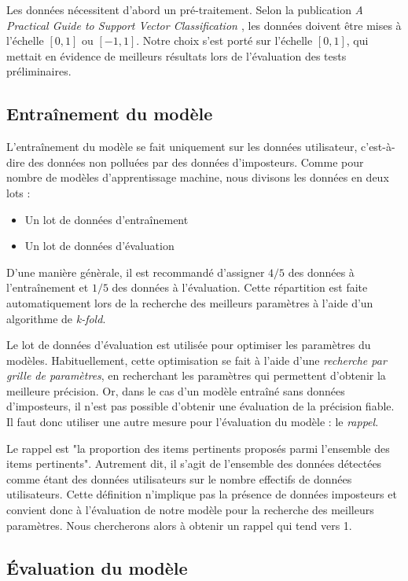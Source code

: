 Les données nécessitent d'abord un pré-traitement. Selon la publication \textit{A Practical Guide to Support Vector Classification \cite{svmpractical}}, les données doivent être mises à l'échelle $[0, 1]$ ou $[-1, 1]$. Notre choix s'est porté sur l'échelle $[0, 1]$, qui mettait en évidence de meilleurs résultats lors de l'évaluation des tests préliminaires.

\label{modele}
\subsection{Entraînement du modèle}

L'entraînement du modèle se fait uniquement sur les données utilisateur, c'est-à-dire des données non polluées par des données d'imposteurs. Comme pour nombre de modèles d'apprentissage machine, nous divisons les données en deux lots :

\begin{itemize}
    \item Un lot de données d'entraînement
    \item Un lot de données d'évaluation
\end{itemize}

D'une manière génèrale, il est recommandé d'assigner $4/5$ des données à l'entraînement et $1/5$ des données à l'évaluation. Cette répartition est faite automatiquement lors de la recherche des meilleurs paramètres à l'aide d'un algorithme de \textit{k-fold}.

Le lot de données d'évaluation est utilisée pour optimiser les paramètres du modèles. Habituellement, cette optimisation se fait à l'aide d'une \textit{recherche par grille de paramètres}, en recherchant les paramètres qui permettent d'obtenir la meilleure précision. Or, dans le cas d'un modèle entraîné sans données d'imposteurs, il n'est pas possible d'obtenir une évaluation de la précision fiable. Il faut donc utiliser une autre mesure pour l'évaluation du modèle : le \textit{rappel}.

Le rappel est "la proportion des items pertinents proposés parmi l'ensemble des items pertinents". Autrement dit, il s'agit de l'ensemble des données détectées comme étant des données utilisateurs sur le nombre effectifs de données utilisateurs. Cette définition n'implique pas la présence de données imposteurs et convient donc à l'évaluation de notre modèle pour la recherche des meilleurs paramètres. Nous chercherons alors à obtenir un rappel qui tend vers 1.

\subsection{Évaluation du modèle}

